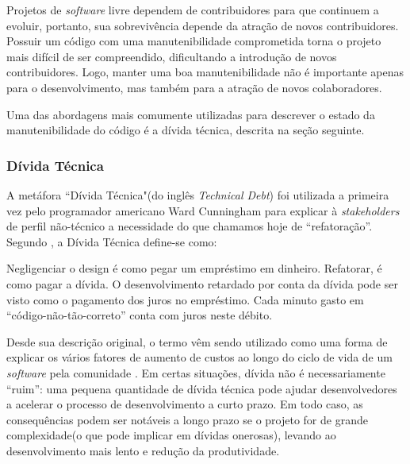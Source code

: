 Projetos de \textit{software} livre dependem de contribuidores
para que continuem a evoluir, portanto, sua sobrevivência depende da
atração de novos contribuidores\cite{crowston2012free}. Possuir um
código com uma manutenibilidade comprometida torna o projeto mais
difícil de ser compreendido, dificultando a introdução de novos contribuidores.
Logo, manter uma boa manutenibilidade não é importante apenas para
o desenvolvimento, mas também para a atração de novos colaboradores.

Uma das abordagens mais comumente utilizadas para descrever o estado da manutenibilidade do código é a dívida técnica, descrita na seção seguinte.
\subsubsection{Dívida Técnica} \label{subsec:technical_debt}
A metáfora ``Dívida Técnica"(do inglês \textit{Technical Debt}) foi utilizada a primeira vez pelo programador americano Ward Cunningham para explicar à \textit{stakeholders} de perfil não-técnico a necessidade do que chamamos hoje de ``refatoração''. Segundo \cite{cunningham1993wycash}, a Dívida Técnica define-se como: 
\begin{quoteAbnt} Negligenciar o design é como pegar um empréstimo em dinheiro. Refatorar, é como pagar a dívida. O desenvolvimento retardado por conta da dívida pode ser visto como o pagamento dos juros no empréstimo. Cada minuto gasto em ``código-não-tão-correto'' conta com juros neste débito.\end{quoteAbnt}

Desde sua descrição original, o termo vêm sendo utilizado como uma forma de explicar os vários fatores de aumento de custos ao longo do ciclo de vida de um \textit{software} pela comunidade \cite{brown2010managing}.
Em certas situações, dívida não é necessariamente ``ruim'': uma pequena quantidade de dívida técnica pode ajudar desenvolvedores a acelerar o processo de desenvolvimento a curto prazo.
Em todo caso, as consequências podem ser notáveis a longo prazo se o projeto for de grande complexidade(o que pode implicar em dívidas onerosas), levando ao desenvolvimento mais lento e redução da produtividade.

